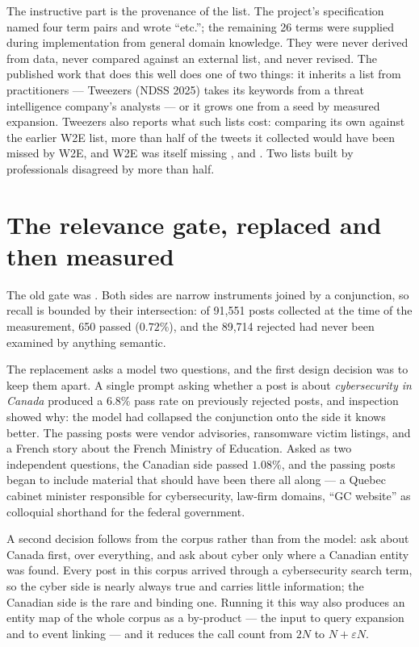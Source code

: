 \documentclass[11pt]{article}
\begin{document}
\begin{warnbox}
The instructive part is the provenance of the list. The project's specification
named four term pairs and wrote ``etc.''; the remaining 26 terms were supplied
during implementation from general domain knowledge. They were never derived
from data, never compared against an external list, and never revised. The
published work that does this well does one of two things: it inherits a list
from practitioners --- Tweezers (NDSS 2025) takes its keywords from a threat
intelligence company's analysts --- or it grows one from a seed by measured
expansion. Tweezers also reports what such lists cost: comparing its own
against the earlier W2E list, more than half of the tweets it collected would
have been missed by W2E, and W2E was itself missing ,
 and . Two lists built by professionals disagreed by more
than half.
\end{warnbox}

\section{The relevance gate, replaced and then measured}

The old gate was
.
Both sides are narrow instruments joined by a conjunction, so recall is bounded
by their intersection: of 91{,}551 posts collected at the time of the
measurement, 650 passed ($0.72\%$), and the 89{,}714 rejected had never been
examined by anything semantic.

The replacement asks a model two questions, and the first design decision was
to keep them apart. A single prompt asking whether a post is about
\emph{cybersecurity in Canada} produced a $6.8\%$ pass rate on previously
rejected posts, and inspection showed why: the model had collapsed the
conjunction onto the side it knows better. The passing posts were vendor
advisories, ransomware victim listings, and a French story about the French
Ministry of Education. Asked as two independent questions, the Canadian side
passed $1.08\%$, and the passing posts began to include material that should
have been there all along --- a Quebec cabinet minister responsible for
cybersecurity,  law-firm domains, ``GC website'' as colloquial
shorthand for the federal government.

A second decision follows from the corpus rather than from the model: ask about
Canada first, over everything, and ask about cyber only where a Canadian entity
was found. Every post in this corpus arrived through a cybersecurity search
term, so the cyber side is nearly always true and carries little information;
the Canadian side is the rare and binding one. Running it this way also
produces an entity map of the whole corpus as a by-product --- the input to
query expansion and to event linking --- and it reduces the call count from
$2N$ to $N + \varepsilon N$.
\end{document}
